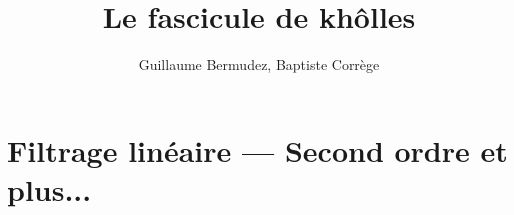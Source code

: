 \documentclass[
 answers,                     %
]
{kholles}
\title{Le fascicule de khôlles}
\author{Guillaume Bermudez, Baptiste Corrège}
\date{}
\begin{document}
\setcounter{part}{28} %
\setcounter{section}{4} %
\setcounter{exercise}{0} %



\section{Filtrage linéaire --- Second ordre et plus...}









%








% 
% 
% 
% 

% 
% 
\end{document}
